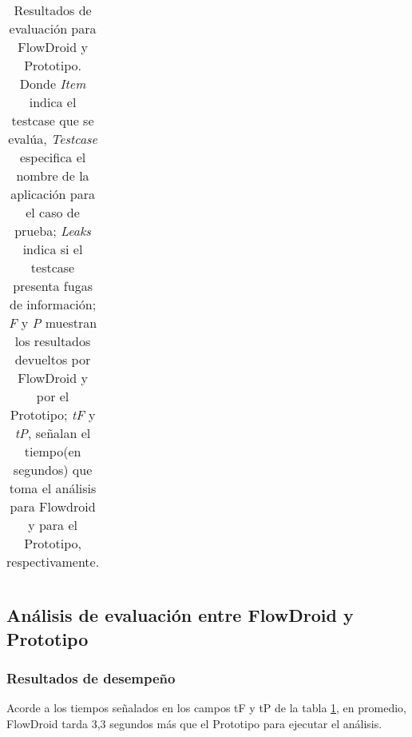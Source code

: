 \begin{table}[H]
\begin{center}
\begin{tabular}{|p{1cm}|p{6cm}|p{1cm}|p{1cm}|p{1cm}|p{1cm}|p{1cm}|}
	\hline
\end{tabular}
\end{center}
\caption{Resultados de evaluación para FlowDroid y Prototipo. Donde
\textit{Item} indica el testcase que se evalúa, \textit{Testcase} especifica el
nombre de la aplicación para el caso de prueba; \textit{Leaks} indica si el
testcase presenta fugas de información; \textit{F} y  \textit{P} muestran los
resultados devueltos por FlowDroid y por el Prototipo; \textit{tF} y
\textit{tP}, señalan el tiempo(en segundos) que toma el análisis para Flowdroid
y para el Prototipo, respectivamente.}
\label{tb:resultados}
\end{table}

\subsection{Análisis de evaluación entre FlowDroid y Prototipo}
\subsubsection{Resultados de desempeño}
Acorde a los tiempos señalados en los campos tF y tP de la tabla
\ref{tb:resultados}, en promedio, FlowDroid tarda 3,3 segundos más que el
Prototipo para ejecutar el análisis.

